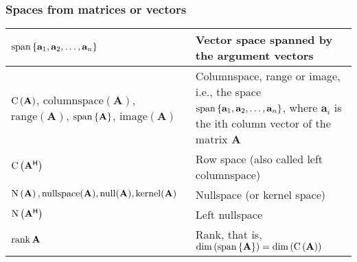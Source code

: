\documentclass{article}
\begin{document}
\subsubsection{Spaces from matrices or vectors}
\begin{xltabular}{\textwidth}{XX}
	\(\operatorname{span}\left\{\mathbf{a}_1, \mathbf{a}_2, \dots, \mathbf{a}_n\right\}\)                                                                                          & Vector space spanned by the argument vectors \cite{golubMatrixComputations2013}                                                                                                                                                                               \\ \hline
	\(\operatorname{C}\left(\mathbf{A}\right)\), \(\mathrm{columnspace}(\mathbf{A})\), \(\mathrm{range}(\mathbf{A})\), \(\operatorname{span}\left\{\mathbf{A}\right\}\), \(\mathrm{image}(\mathbf{A})\) & Columnspace, range or image, i.e., the space \(\operatorname{span}\left\{\mathbf{a}_1,\mathbf{a}_2, \dots, \mathbf{a}_n\right\}\), where \(\mathbf{a}_i\) is the ith column vector of the matrix \(\mathbf{A}\) \cite{strangIntroductionLinearAlgebra1993, nossekAdaptiveArraySignal2015} \\ \hline
	\(\operatorname{C}\left(\mathbf{A}^\mathsf{H}\right)\)                                                                                                                  & Row space (also called left columnspace) \cite{strangIntroductionLinearAlgebra1993, nossekAdaptiveArraySignal2015}                                                                                                                                            \\ \hline
	\(\operatorname{N}\left(\mathbf{A}\right), \mathrm{nullspace}(\mathbf{A}), \mathrm{null}(\mathbf{A}), \mathrm{kernel}(\mathbf{A})\)                                 & Nullspace (or kernel space) \cite{strangIntroductionLinearAlgebra1993, nossekAdaptiveArraySignal2015,theodoridisMachineLearningBayesian2020}                                                                                                                  \\ \hline
	\(\operatorname{N}\left(\mathbf{A^\mathsf{H}}\right)\)                                                                                                              & Left nullspace                                                                                                                                                                                                                                                \\ \hline
	\(\rank{\mathbf{A}}\)                                                                                                                              & Rank, that is, \(\operatorname{dim}\left(\operatorname{span}\left\{\mathbf{A}\right\}\right) = \operatorname{dim}\left(\operatorname{C}\left(\mathbf{A}\right)\right)\) \cite{nossekAdaptiveArraySignal2015}                                                                                                                                                     \\ \hline

\end{xltabular}
\end{document}
